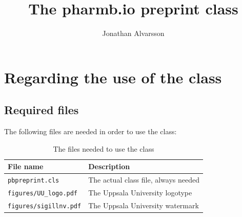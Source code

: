 \documentclass[pharmbio, watermark]{pbpreprint}
\begin{document}
\title{The pharm\textcolor{uured}{b.io} preprint class}
\author{Jonathan Alvarsson}
\maketitle
\begin{KeepFromToc}
   \tableofcontents
\end{KeepFromToc}
\section{Regarding the use of the class}
\subsection{Required files}
The following files are needed in order to use the class:

\begin{table}[H]
    \centering
    \caption{The files needed to use the class}
    \begin{tabular}{ll}
    \toprule
    File name & Description \\
    \midrule
    \texttt{pbpreprint.cls} & The actual class file, always needed \\
    \texttt{figures/UU\_logo.pdf} & The Uppsala University logotype \\
    \texttt{figures/sigillnv.pdf} & The Uppsala University watermark \\
    \bottomrule
    \end{tabular}
\end{table}
\end{document}
